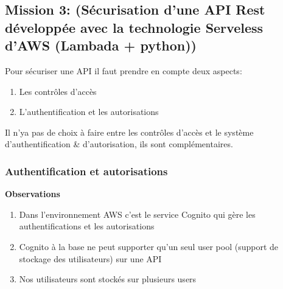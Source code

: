 \subsection{Mission 3: (Sécurisation d’une API Rest développée avec la technologie Serveless d’AWS (Lambada + python))}
Pour sécuriser une API il faut prendre en compte deux aspects:
\begin{enumerate}
\item Les contrôles d'accès 
\item L'authentification et les autorisations
\end{enumerate}
Il n'ya pas de choix à faire entre les contrôles d'accès et le système d'authentification \& d'autorisation, ils sont complémentaires.
\subsubsection{Authentification et autorisations}
\textbf{Observations}
\begin{enumerate}
\item Dans l'environnement AWS c'est le service Cognito qui gère  les authentifications et les autorisations 
\item Cognito à la base ne peut supporter qu'un seul user pool (support de stockage des utilisateurs) sur une API
\item Nos utilisateurs sont stockés sur plusieurs users
\end{enumerate}

